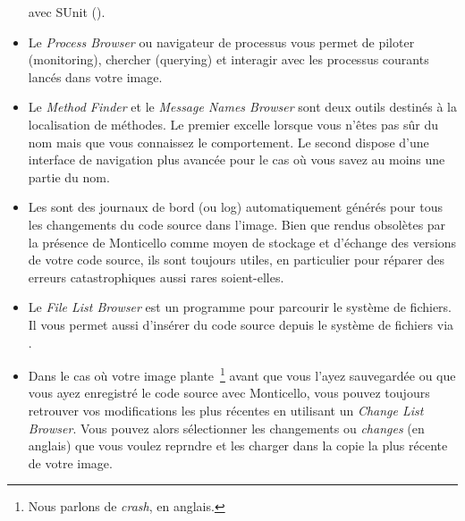 \documentclass[a4paper,10pt,twoside]{book}
\begin{document}
\begin{itemize}
avec 
SUnit ().
  \item Le \emph{Process Browser} ou navigateur de processus vous permet de piloter (monitoring), chercher (querying) et interagir avec les processus courants lanc\'es dans votre image.
  \item Le \emph{Method Finder} et le \emph{Message Names Browser} sont 
deux outils destin\'es \`a la localisation de m\'ethodes. Le
premier excelle lorsque vous n'\^etes pas s\^ur du nom mais que vous
connaissez le comportement.
Le second dispose d'une interface de navigation plus avanc\'ee pour le cas o\`u
vous savez au moins une partie du nom.
  \item Les \changesets sont des journaux de bord (ou log) automatiquement g\'en\'er\'es pour tous les changements du code source dans l'image.
Bien que rendus obsol\`etes par la pr\'esence de Monticello comme
moyen de stockage et d'\'echange des versions de votre code source,
ils sont toujours utiles, en particulier pour r\'eparer des erreurs
catastrophiques aussi rares soient-elles.
  \item Le \emph{File List Browser} est un programme pour parcourir le
syst\`eme de fichiers. Il vous permet aussi d'ins\'erer du code
source depuis le syst\`eme de fichiers via .
  \item Dans le cas o\`u votre image plante~\footnote{Nous parlons de \emph{crash}, en anglais.} avant que
vous l'ayez sauvegard\'ee ou que vous ayez enregistr\'e le code source
avec Monticello, vous pouvez toujours retrouver vos modifications les
plus r\'ecentes en utilisant un \emph{Change List Browser}. 
Vous pouvez alors s\'electionner les changements ou \emph{changes} (en anglais) que vous voulez reprndre et les charger dans la copie la plus r\'ecente de votre image.
\end{itemize}

\ifx\wholebook\relax\else
\end{document}

